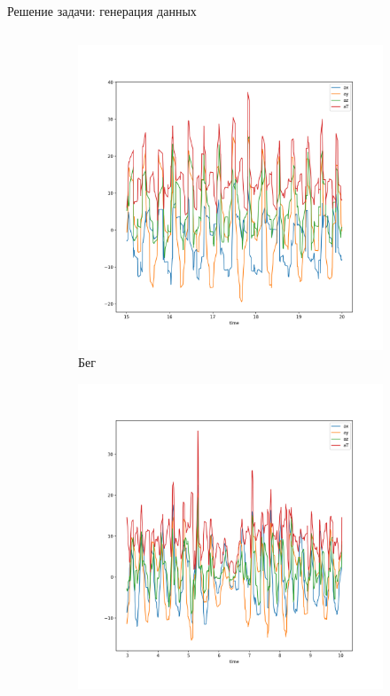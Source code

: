 \documentclass{beamer}
\begin{document}
\begin{frame}{Решение задачи: генерация данных}
\begin{columns}
\begin{column}{.6\textwidth}
\begin{figure}
\begin{subfigure}[b]{0.48\textwidth}
                    \includegraphics[width=\linewidth]{../pics/raw_run.png}
                    \caption{Бег}
                \end{subfigure}
                \begin{subfigure}[b]{0.48\textwidth}
                    \centering
                    \includegraphics[width=\linewidth]{../pics/raw_go_up.png}

\end{subfigure}
\end{figure}
\end{column}
\end{columns}
\end{frame}
\end{document}
